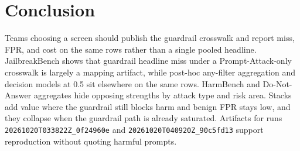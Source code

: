 \section{Conclusion}
\label{sec:conclusion}

Teams choosing a screen should publish the guardrail crosswalk and report miss, FPR, and cost on the same rows rather than a single pooled headline.
JailbreakBench shows that guardrail headline miss under a Prompt-Attack-only crosswalk is largely a mapping artifact, while post-hoc any-filter aggregation and decision models at 0.5 sit elsewhere on the same rows.
HarmBench and Do-Not-Answer aggregates hide opposing strengths by attack type and risk area.
Stacks add value where the guardrail still blocks harm and benign FPR stays low, and they collapse when the guardrail path is already saturated.
Artifacts for runs \texttt{20261020T033822Z\_0f24960e} and \texttt{20261020T040920Z\_90c5fd13} support reproduction without quoting harmful prompts.
